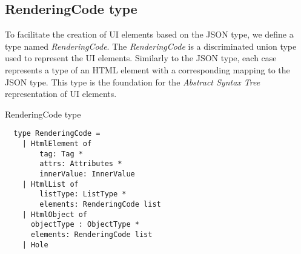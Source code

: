 \subsection{RenderingCode type}
To facilitate the creation of UI elements based on the JSON type, we define a type named \emph{RenderingCode}.
The \emph{RenderingCode} is a discriminated union type used to represent the UI elements.
Similarly to the JSON type, each case represents a type of an HTML element with a corresponding mapping to the JSON type.
This type is the foundation for the \emph{Abstract Syntax Tree} representation of UI elements.
\begin{listing}[H]
	\caption {RenderingCode type}
	\begin{lstlisting}
  type RenderingCode =
    | HtmlElement of
        tag: Tag *
        attrs: Attributes *
        innerValue: InnerValue
    | HtmlList of
        listType: ListType *
        elements: RenderingCode list
    | HtmlObject of
      objectType : ObjectType *
      elements: RenderingCode list
    | Hole
  \end{lstlisting}
\end{listing}

